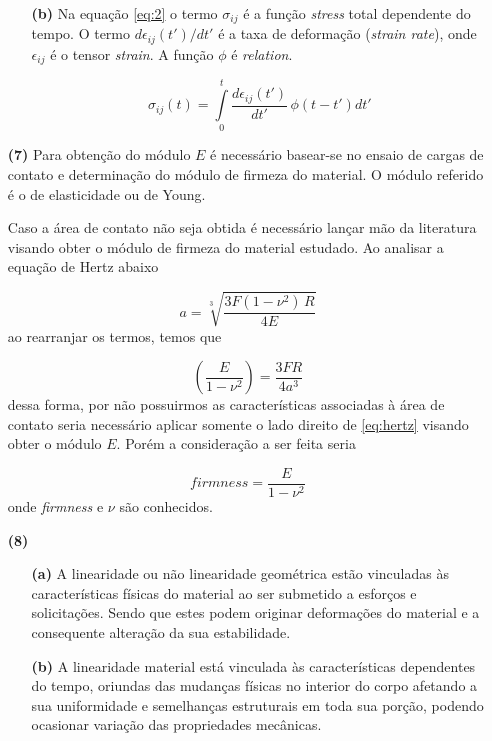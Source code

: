 \documentclass[a4paper, 12pt]{article}
\begin{document}
\begin{itemize}
\begin{itemize}
			
			\item[\textbf{(b)}] Na equação \eqref{eq:2} o termo $\sigma_{ij}$ é a função \textit{stress} total dependente do tempo. O termo $d\epsilon_{ij}(t')/dt'$ é a taxa de deformação (\textit{strain rate}), onde $\epsilon_{ij}$ é o tensor \textit{strain}. A função $\phi$ é \textit{relation}.
			
			\begin{equation}
				\label{eq:2}
				\sigma_{ij}(t)=\int\limits_{0}^{t}\dfrac{d\epsilon_{ij}(t')}{dt'}\,\phi(t-t')dt'
			\end{equation}
		\end{itemize}
		
		\item[\textbf{(7)}] Para obtenção do módulo $E$ é necessário basear-se no ensaio de cargas de contato e determinação do módulo de firmeza do material. O módulo referido é o de elasticidade ou de Young. 
		
		Caso a área de contato não seja obtida é necessário lançar mão da literatura visando obter o módulo de firmeza do material estudado. Ao analisar a equação de Hertz abaixo
		
		\begin{equation}
			a=\sqrt[3]{\dfrac{3F(1-\nu^{2})\,R}{4E}}
		\end{equation}
		ao rearranjar os termos, temos que
		
		\begin{equation}
			\label{eq:hertz}
			\left(\dfrac{E}{1-\nu^{2}}\right)=\dfrac{3FR}{4a^{3}}
		\end{equation}
		dessa forma, por não possuirmos as características associadas à área de contato seria necessário aplicar somente o lado direito de \eqref{eq:hertz} visando obter o módulo $E$. Porém a consideração a ser feita seria
		
		\begin{equation}
			\textit{firmness}=\dfrac{E}{1-\nu^{2}}
		\end{equation}
		onde \textit{firmness} e $\nu$ são conhecidos.
	
		\item[\textbf{(8)}]		
		
		\begin{itemize}
			\item[\textbf{(a)}] A linearidade ou não linearidade geométrica estão vinculadas às características físicas do material ao ser submetido a esforços e solicitações. Sendo que estes podem originar deformações do material e a consequente alteração da sua estabilidade.
			\item[\textbf{(b)}] A linearidade material está vinculada às características dependentes do tempo, oriundas das mudanças físicas no interior do corpo afetando a sua uniformidade e semelhanças estruturais em toda sua porção, podendo ocasionar variação das propriedades mecânicas.
		\end{itemize}
	

\end{itemize}
\end{document}
